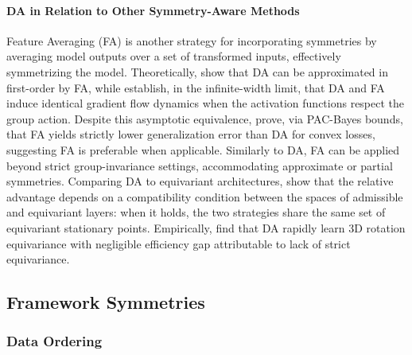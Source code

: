 \documentclass[mathematics,review,submit,moreauthors]{Definitions/mdpi}
\begin{document}
\paragraph{DA in Relation to Other Symmetry-Aware Methods}
Feature Averaging (FA) is another strategy for incorporating symmetries by averaging model outputs over a set of transformed inputs, effectively symmetrizing the model.
Theoretically, \citet{dao2019p3icml} show that DA can be approximated in first-order by FA, while \citet{maass2024} establish, in the infinite-width limit, that DA and FA induce identical gradient flow dynamics when the activation functions respect the group action.
Despite this asymptotic equivalence, \citet{lyle2020} prove, via PAC-Bayes bounds, that FA yields strictly lower generalization error than DA for convex losses, suggesting FA is preferable when applicable.
Similarly to DA, FA can be applied beyond strict group-invariance settings, accommodating approximate or partial symmetries.
Comparing DA to equivariant architectures, \citet{nordenfors2024} show that the relative advantage depends on a compatibility condition between the spaces of admissible and equivariant layers: when it holds, the two strategies share the same set of equivariant stationary points.
Empirically, \citet{shen2026} find that DA rapidly learn 3D rotation equivariance with negligible efficiency gap attributable to lack of strict equivariance.

\subsection{Framework Symmetries}

\subsubsection{Data Ordering}\label{sec:data-ordering}
\end{document}
